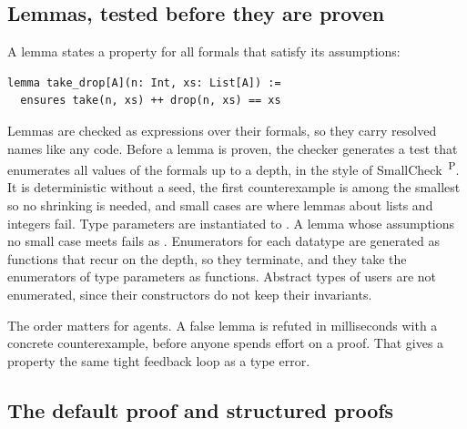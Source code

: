 \documentclass[11pt,a4paper]{article}
\newcommand{\code}[1]{\texttt{\detokenize{#1}}}
\newcommand{\planned}{\textsuperscript{\textsf{\scriptsize P}}}
\begin{document}
\subsection{Lemmas, tested before they are proven}

A lemma states a property for all formals that satisfy its assumptions:
\begin{lstlisting}
lemma take_drop[A](n: Int, xs: List[A]) :=
  ensures take(n, xs) ++ drop(n, xs) == xs
\end{lstlisting}
Lemmas are checked as \code{Bool} expressions over their formals, so they carry resolved names
like any code. Before a lemma is proven, the checker generates a test \code{l.lemma} that
enumerates all values of the formals up to a depth, in the style of
SmallCheck~\cite{runciman2008smallcheck}\planned. It is deterministic without a seed, the
first counterexample is among the smallest so no shrinking is needed, and small cases are
where lemmas about lists and integers fail. Type parameters are instantiated to \code{Int}.
A lemma whose assumptions no small case meets fails as \code{Vacuous}. Enumerators for each
datatype are generated as functions that recur on the depth, so they terminate, and they take
the enumerators of type parameters as functions. Abstract types of users are not enumerated,
since their constructors do not keep their invariants.

The order matters for agents. A false lemma is refuted in milliseconds with a concrete
counterexample, before anyone spends effort on a proof. That gives a property the same tight
feedback loop as a type error.

\subsection{The default proof and structured proofs}
\end{document}
